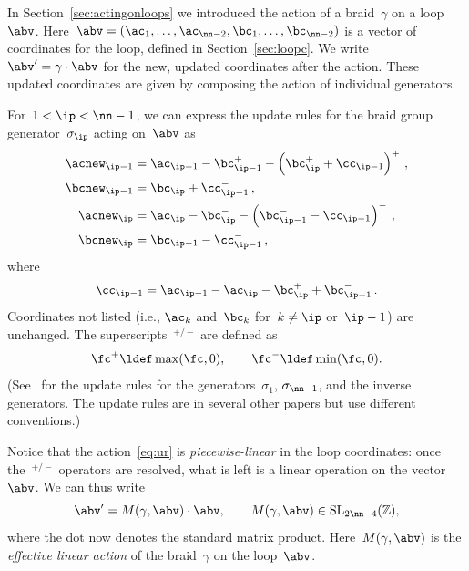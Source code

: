 \documentclass[12pt]{article}
\renewcommand{\l}{\left}                        %
\renewcommand{\r}{\right}                       %
\newcommand{\pos}[1]{#1^+}
\renewcommand{\neg}[1]{#1^-}
\begin{document}
%
%
%
%

In Section~\ref{sec:actingonloops} we introduced the action of a
braid~$\gamma$ on a loop~$\abv$.
Here~$\abv=(\ac_1,\ldots,\ac_{\nn-2},\bc_1,\ldots,\bc_{\nn-2})$ is a vector of
coordinates for the loop, %
%
defined in Section~\ref{sec:loopc}.  We write~$\abv' = \gamma\cdot\abv$ for
the new, updated coordinates after the action.  These updated coordinates are
given by composing the action of individual generators.

For~$1 < \ip < \nn-1$, we can express the update rules for the braid group
generator~$\sigma_\ip$ acting on~$\abv$ as
\begin{subequations}
\begin{align}
  \acnew_{\ip-1} &= \ac_{\ip-1} - \pos{\bc_{\ip-1}}
    - \pos{\l(\pos{\bc_\ip} + \cc_{\ip-1}\r)}\,,\\
  \bcnew_{\ip-1} &= \bc_\ip + \neg{\cc_{\ip-1}}\,,\\
  \acnew_\ip &= \ac_\ip - \neg{\bc_\ip}
    - \neg{\l(\neg{\bc_{\ip-1}} - \cc_{\ip-1}\r)}\,,\\
  \bcnew_\ip &= \bc_{\ip-1} - \neg{\cc_{\ip-1}}\,,
\end{align}
\label{eq:ur}%
\end{subequations}
where
\begin{equation}
  \cc_{\ip-1} = \ac_{\ip-1} - \ac_\ip - \pos{\bc_\ip} + \neg{\bc_{\ip-1}}\,.
  \label{eq:ccdef}
\end{equation}
Coordinates not listed (i.e., $\ac_k$ and~$\bc_k$ for~$k\ne\ip$ or~$\ip-1$)
are unchanged.  The superscripts~${}^{+/-}$ are defined as
\begin{equation}
  \pos\fc \ldef \max(\fc,0),\qquad
  \neg\fc \ldef \min(\fc,0).
\end{equation}
(See~\citet{Thiffeault2010} for the update rules for the
generators~$\sigma_1$, $\sigma_{\nn-1}$, and the inverse generators.  The
update rules are in several other papers but use different conventions.)

Notice that the action~\eqref{eq:ur} is \emph{piecewise-linear} in the loop
coordinates: once the~${}^{+/-}$ operators are resolved, what is left is a
linear operation on the vector~$\abv$.  We can thus write
\begin{equation}
  \abv' = M(\gamma,\abv)\cdot\abv,
  \qquad
  M(\gamma,\abv) \in \mathrm{SL}_{2\nn-4}(\mathbb{Z}),
\end{equation}
where the dot now denotes the standard matrix product.  Here~$M(\gamma,\abv)$
is the \emph{effective linear action} of the braid~$\gamma$ on the
loop~$\abv$.
\end{document}
